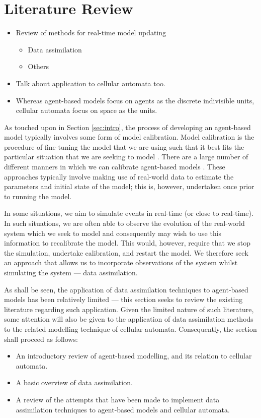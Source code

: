 \section{Literature Review}\label{sec:lit_rev}

\begin{itemize}
    \item Review of methods for real-time model updating
    \begin{itemize}
        \item Data assimilation
        \item Others
    \end{itemize}
    \item Talk about application to cellular automata too.
    \item Whereas agent-based models focus on agents as the discrete indivisible
        units, cellular automata focus on space as the units.
\end{itemize}

As touched upon in Section \ref{sec:intro}, the process of developing an
agent-based model typically involves some form of model calibration.
Model calibration is the procedure of fine-tuning the model that we are using
such that it best fits the particular situation that we are seeking to model
\citep{crooks2012introduction}.
There are a large number of different manners in which we can calibrate
agent-based models \citep{thiele2014facilitating}.
These approaches typically involve making use of real-world data to estimate the
parameters and initial state of the model; this is, however, undertaken once
prior to running the model.

In some situations, we aim to simulate events in real-time (or close to
real-time).
In such situations, we are often able to observe the evolution of
the real-world system which we seek to model and consequently may wish to use
this information to recalibrate the model.
This would, however, require that we stop the simulation, undertake calibration,
and restart the model.
We therefore seek an approach that allows us to incorporate observations of the
system whilst simulating the system --- data assimilation.

As shall be seen, the application of data assimilation techniques to agent-based
models has been relatively limited --- this section seeks to review the existing
literature regarding such application.
Given the limited nature of such literature, some attention will also be given
to the application of data assimilation methods to the related modelling
technique of cellular automata.
Consequently, the section shall proceed as follows:
\begin{itemize}
    \item An introductory review of agent-based modelling, and its relation to
        cellular automata.
    \item A basic overview of data assimilation.
    \item A review of the attempts that have been made to implement data
        assimilation techniques to agent-based models and cellular automata.
\end{itemize}


